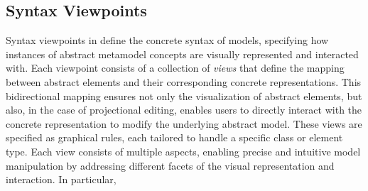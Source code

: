 \begin{comment}
        
    \end{tabular}
  
\end{table}
\end{comment}






\subsection{Syntax Viewpoints}
Syntax viewpoints in \jjodel{} define the concrete syntax of models, specifying how instances of abstract metamodel concepts are visually represented and interacted with. Each viewpoint consists of a collection of \textit{views} that define the mapping between abstract elements and their corresponding concrete representations. This bidirectional mapping ensures not only the visualization of abstract elements, but also, in the case of projectional editing, enables users to directly interact with the concrete representation to modify the underlying abstract model. These views are specified as graphical rules, each tailored to handle a specific class or element type. Each view consists of multiple aspects, enabling precise and intuitive model manipulation by addressing different facets of the visual representation and interaction. In particular,

